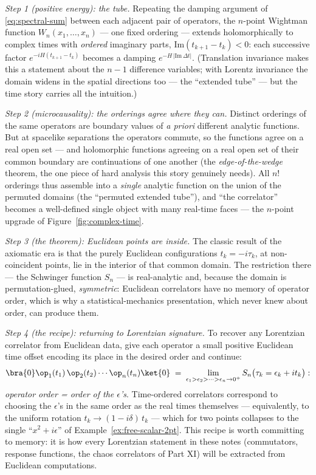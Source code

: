 \emph{Step 1 (positive energy): the tube.} Repeating the damping argument of
\eqref{eq:spectral-sum} between each adjacent pair of operators, the
$n$-point Wightman function $W_n(x_1, \dots, x_n)$ --- one fixed ordering ---
extends holomorphically to complex times with \emph{ordered} imaginary parts,
$\mathrm{Im}(t_{k+1} - t_k) < 0$: each successive factor $e^{-iH(t_{k+1} -
t_k)}$ becomes a damping $e^{-H\,|\mathrm{Im}\,\Delta t|}$. (Translation
invariance makes this a statement about the $n-1$ difference variables; with
Lorentz invariance the domain widens in the spatial directions too --- the
``extended tube'' --- but the time story carries all the intuition.)

\emph{Step 2 (microcausality): the orderings agree where they can.} Distinct
orderings of the same operators are boundary values of \emph{a priori}
different analytic functions. But at spacelike separations the operators
commute, so the functions agree on a real open set --- and holomorphic
functions agreeing on a real open set of their common boundary are
continuations of one another (the \emph{edge-of-the-wedge} theorem, the one
piece of hard analysis this story genuinely needs). All $n!$ orderings thus
assemble into a
\emph{single} analytic function on the union of the permuted domains (the
``permuted extended tube''), and ``the correlator'' becomes a well-defined
single object with many real-time faces --- the $n$-point upgrade of
Figure~\ref{fig:complex-time}.

\emph{Step 3 (the theorem): Euclidean points are inside.} The classic result
of the axiomatic era is that the purely Euclidean configurations $t_k =
-i\tau_k$, at non-coincident points, lie in the interior of that common
domain. The restriction there --- the Schwinger function $S_n$ --- is
real-analytic and, because the domain is permutation-glued,
\emph{symmetric}: Euclidean correlators have no memory of operator order,
which is why a statistical-mechanics presentation, which never knew about
order, can produce them.

\emph{Step 4 (the recipe): returning to Lorentzian signature.} To recover any Lorentzian
correlator from Euclidean data, give each operator a small positive Euclidean
time offset encoding its place in the desired order and continue:
\begin{equation}
\bra{0}\op_1(t_1)\,\op_2(t_2)\cdots\op_n(t_n)\ket{0}
\;=\;
\lim_{\epsilon_1 > \epsilon_2 > \cdots > \epsilon_n \to 0^+}
S_n\big(\tau_k = \epsilon_k + i t_k\big):
\label{eq:continuation-recipe}
\end{equation}
\emph{operator order = order of the $\epsilon$'s}. Time-ordered correlators
correspond to choosing the $\epsilon$'s in the same order as the real times
themselves --- equivalently, to the uniform rotation $t_k \to (1 -
i\delta)\,t_k$ --- which for two points collapses to the single ``$x^2 +
i\epsilon$'' of Example~\ref{ex:free-scalar-2pt}. This recipe
is worth committing to memory: it is how every Lorentzian statement in these
notes (commutators, response functions, the chaos correlators of Part XI)
will be extracted from Euclidean computations.


